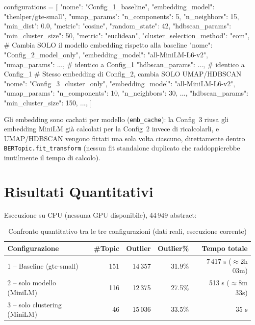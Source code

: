 \documentclass[12pt,a4paper]{article}
\begin{document}
\begin{pylisting}[title={Le tre configurazioni: un solo campo cambia fra righe consecutive}]
configurations = [
    {"nome": "Config_1_baseline", "embedding_model": "thenlper/gte-small",
     "umap_params": {"n_components": 5, "n_neighbors": 15, "min_dist": 0.0,
                      "metric": "cosine", "random_state": 42},
     "hdbscan_params": {"min_cluster_size": 50, "metric": "euclidean",
                         "cluster_selection_method": "eom"}},
    {  # Cambia SOLO il modello embedding rispetto alla baseline
     "nome": "Config_2_model_only", "embedding_model": "all-MiniLM-L6-v2",
     "umap_params": {...},      # identico a Config_1
     "hdbscan_params": {...}},  # identico a Config_1
    {  # Stesso embedding di Config_2, cambia SOLO UMAP/HDBSCAN
     "nome": "Config_3_cluster_only", "embedding_model": "all-MiniLM-L6-v2",
     "umap_params": {"n_components": 10, "n_neighbors": 30, ...},
     "hdbscan_params": {"min_cluster_size": 150, ...}},
]
\end{pylisting}

Gli embedding sono cachati per modello (\texttt{emb\_cache}): la Config~3 riusa gli embedding MiniLM gi\`a calcolati per la Config~2 invece di ricalcolarli, e UMAP/HDBSCAN vengono fittati una sola volta ciascuno, direttamente dentro \texttt{BERTopic.fit\_transform} (nessun fit standalone duplicato che raddoppierebbe inutilmente il tempo di calcolo).

\section{Risultati Quantitativi}

Esecuzione su CPU (nessuna GPU disponibile), 44\,949 abstract:

\begin{table}[H]
  \centering
  \caption{Confronto quantitativo tra le tre configurazioni (dati reali, esecuzione corrente)}
  \begin{tabular}{lrrrr}
    \toprule
    \textbf{Configurazione} & \textbf{\#Topic} & \textbf{Outlier} & \textbf{Outlier\%} & \textbf{Tempo totale} \\
    \midrule
    1 -- Baseline (gte-small)          & 151 & 14\,357 & 31.9\% & 7\,417 s ($\approx$2h 03m) \\
    2 -- solo modello (MiniLM)         & 116 & 12\,375 & 27.5\% & 513 s ($\approx$8m 33s) \\
    3 -- solo clustering (MiniLM)      &  46 & 15\,036 & 33.5\% & 35 s \\
    \bottomrule
  \end{tabular}
\end{table}
\end{document}
